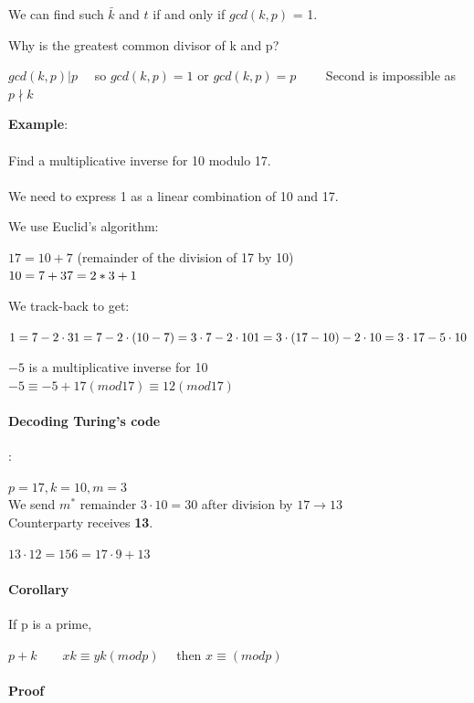 \documentclass[9pt, letterpaper, oneside]{article}
\begin{document}
We can find such $\bar{k}$ and $t$ if and only if $gcd(k, p)$ = 1.

Why is the greatest common divisor of k and p?

$gcd(k,p) | p \quad$ so $gcd(k,p) = 1$ or $gcd(k,p) = p\qquad$ Second is impossible as $p \nmid k$

\textbf{Example}:\\
\\
Find a multiplicative inverse for 10 modulo 17.\\
\\
We need to express 1 as a linear combination of 10 and 17.

We use Euclid's algorithm:

$17 = 10 + 7$ (remainder of the division of 17 by 10)\\
$10 = 7 + 3\\
7 = 2 * 3 + 1\\$

We track-back to get:

$1 = 7 - 2 \cdot 3 \\
1 = 7 - 2 \cdot (10 -7) = 3 \cdot 7 - 2 \cdot 10 \\
1 = 3 \cdot (17 - 10) - 2 \cdot 10 = 3 \cdot 17 - 5 \cdot 10 \\$

$-5$ is a multiplicative inverse for 10\\
$-5 \equiv -5 + 17 (mod 17) \equiv 12 (mod 17)$

\paragraph{Decoding Turing's code}:

$p = 17, k = 10, m = 3$\\
We send $m^*$ remainder $3 \cdot 10 = 30$ after division by $17 \to 13$\\
Counterparty receives \textbf{13}.

$13 \cdot 12 = 156 = 17 \cdot 9 + 13$

\paragraph{Corollary}

If p is a prime, 

$p + k \qquad xk \equiv yk (mod p) \quad$ then $x \equiv (mod p)$

\paragraph{Proof}
\end{document}
